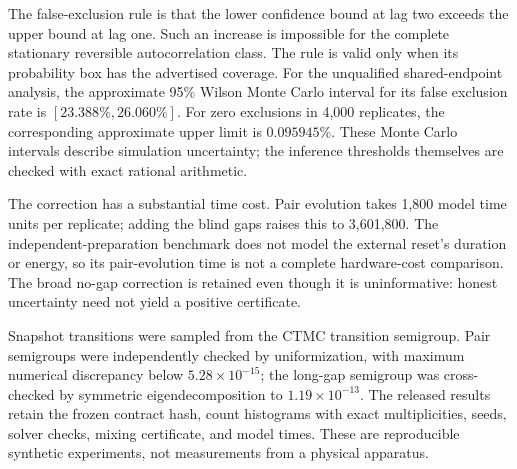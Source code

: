 The false-exclusion rule is that the lower confidence bound at lag two exceeds
the upper bound at lag one. Such an increase is impossible for the complete
stationary reversible autocorrelation class. The rule is valid only when its
probability box has the advertised coverage. For the unqualified shared-endpoint
analysis, the approximate 95\% Wilson Monte Carlo interval for its false
exclusion rate is $[23.388\%,26.060\%]$. For zero exclusions in 4,000 replicates,
the corresponding approximate upper limit is $0.095945\%$. These Monte Carlo
intervals describe simulation uncertainty; the inference thresholds themselves
are checked with exact rational arithmetic.

The correction has a substantial time cost. Pair evolution takes 1,800 model
time units per replicate; adding the blind gaps raises this to 3,601,800.
The independent-preparation benchmark does not model the external reset's
duration or energy, so its pair-evolution time is not a complete hardware-cost
comparison. The broad no-gap correction is retained even though it is
uninformative: honest uncertainty need not yield a positive certificate.

Snapshot transitions were sampled from the CTMC transition semigroup. Pair
semigroups were independently checked by uniformization, with maximum
numerical discrepancy below $5.28\times10^{-15}$; the long-gap semigroup was
cross-checked by symmetric eigendecomposition to $1.19\times10^{-13}$.
The released results retain the frozen contract hash, count histograms with
exact multiplicities, seeds, solver checks, mixing certificate, and model
times. These are reproducible synthetic experiments, not measurements from a
physical apparatus.
